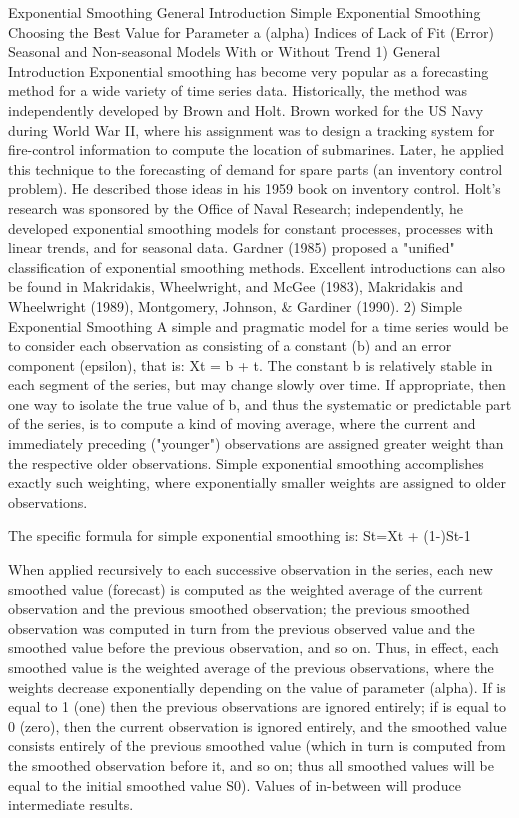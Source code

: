 Exponential Smoothing
General Introduction
Simple Exponential Smoothing
Choosing the Best Value for Parameter a (alpha)
Indices of Lack of Fit (Error)
Seasonal and Non-seasonal Models With or Without Trend
1) General Introduction
Exponential smoothing has become very popular as a forecasting method for a wide variety of time series data. Historically, the method was independently developed by Brown and Holt. Brown worked for the US Navy during World War II, where his assignment was to design a tracking system for fire-control information to compute the location of submarines. Later, he applied this technique to the forecasting of demand for spare parts (an inventory control problem). He described those ideas in his 1959 book on inventory control. Holt's research was sponsored by the Office of Naval Research; independently, he developed exponential smoothing models for constant processes, processes with linear trends, and for seasonal data.
Gardner (1985) proposed a "unified" classification of exponential smoothing methods. Excellent introductions can also be found in Makridakis, Wheelwright, and McGee (1983), Makridakis and Wheelwright (1989), Montgomery, Johnson, & Gardiner (1990).
2) Simple Exponential Smoothing
A simple and pragmatic model for a time series would be to consider each observation as consisting of a constant (b) and an error component  (epsilon), that is: Xt = b + t. The constant b is relatively stable in each segment of the series, but may change slowly over time. If appropriate, then one way to isolate the true value of b, and thus the systematic or predictable part of the series, is to compute a kind of moving average, where the current and immediately preceding ("younger") observations are assigned greater weight than the respective older observations. Simple exponential smoothing accomplishes exactly such weighting, where exponentially smaller weights are assigned to older observations. 

The specific formula for simple exponential smoothing is:	St=Xt + (1-)St-1

When applied recursively to each successive observation in the series, each new smoothed value (forecast) is computed as the weighted average of the current observation and the previous smoothed observation; the previous smoothed observation was computed in turn from the previous observed value and the smoothed value before the previous observation, and so on. Thus, in effect, each smoothed value is the weighted average of the previous observations, where the weights decrease exponentially depending on the value of parameter  (alpha). If  is equal to 1 (one) then the previous observations are ignored entirely; if  is equal to 0 (zero), then the current observation is ignored entirely, and the smoothed value consists entirely of the previous smoothed value (which in turn is computed from the smoothed observation before it, and so on; thus all smoothed values will be equal to the initial smoothed value S0). Values of  in-between will produce intermediate results.

